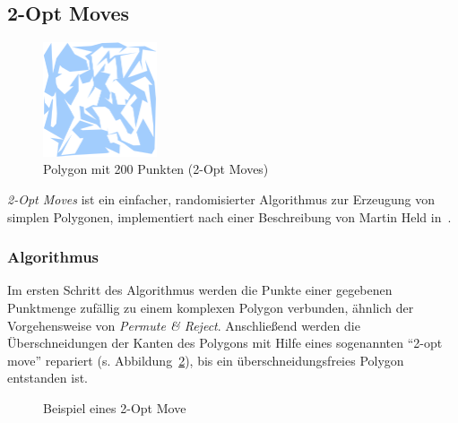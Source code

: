 \subsection{2-Opt Moves}

  \begin{figure}[h]
    \begin{center}
      \includegraphics[width=0.3\textwidth]{img/2opt200.eps}
    \end{center}
    \caption{Polygon mit 200 Punkten (2-Opt Moves)}
    \label{fig:2opt200}
  \end{figure}

  \emph{2-Opt Moves} ist ein einfacher, randomisierter Algorithmus zur
  Erzeugung von simplen Polygonen, implementiert nach einer Beschreibung von
  Martin Held in~\cite{held98polygons}.    \subsubsection{Algorithmus}   Im
  ersten Schritt des Algorithmus werden die Punkte einer gegebenen Punktmenge
  zufällig zu einem komplexen Polygon verbunden, ähnlich der Vorgehensweise von
  \emph{Permute \& Reject}. Anschließend werden die Überschneidungen der Kanten
  des Polygons mit Hilfe eines sogenannten \enquote{2-opt move} repariert (s.
  Abbildung~\ref{fig:2optmove}), bis ein überschneidungsfreies Polygon
  entstanden ist.

  \begin{figure}[h]
    \begin{center}
    \end{center}
    \caption{Beispiel eines 2-Opt Move}
    \label{fig:2optmove}
  \end{figure}

